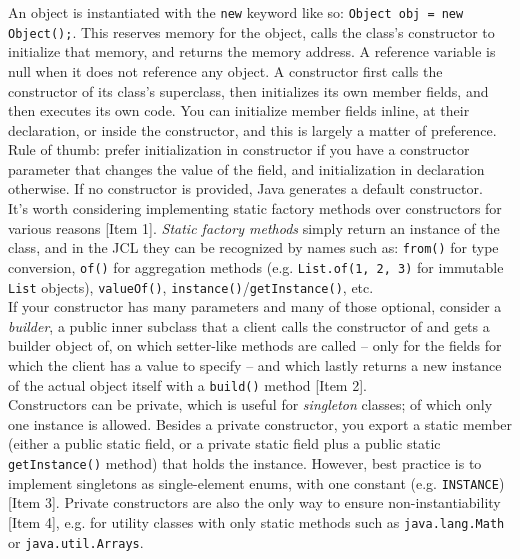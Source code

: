 \documentclass[8pt, table, xcdraw]{article}%
\begin{document}
An object is instantiated with the \lstinline{new} keyword like so: \lstinline{Object obj = new Object();}. This reserves memory for the object, calls the class's constructor to initialize that memory, and returns the memory address. A reference variable is null when it does not reference any object. A constructor first calls the constructor of its class's superclass, then initializes its own member fields, and then executes its own code. You can initialize member fields inline, at their declaration, or inside the constructor, and this is largely a matter of preference. Rule of thumb: prefer initialization in constructor if you have a constructor parameter that changes the value of the field, and initialization in declaration otherwise. If no constructor is provided, Java generates a default constructor.\\
It's worth considering implementing static factory methods over constructors for various reasons [Item 1]. \emph{Static factory methods} simply return an instance of the class, and in the JCL they can be recognized by names such as: \lstinline{from()} for type conversion, \lstinline{of()} for aggregation methods (e.g. \lstinline{List.of(1, 2, 3)} for immutable \lstinline{List} objects), \lstinline{valueOf()}, \lstinline{instance()}/\lstinline{getInstance()}, etc.\\
If your constructor has many parameters and many of those optional, consider a \emph{builder}, a public inner subclass that a client calls the constructor of and gets a builder object of, on which setter-like methods are called -- only for the fields for which the client has a value to specify -- and which lastly returns a new instance of the actual object itself with a \lstinline{build()} method [Item 2].\\
Constructors can be private, which is useful for \emph{singleton} classes; of which only one instance is allowed. Besides a private constructor, you export a static member (either a public static field, or a private static field plus a public static \lstinline{getInstance()} method) that holds the instance. However, best practice is to implement singletons as single-element enums, with one constant (e.g. \lstinline{INSTANCE}) [Item 3]. Private constructors are also the only way to ensure non-instantiability [Item 4], e.g. for utility classes with only static methods such as \lstinline{java.lang.Math} or \lstinline{java.util.Arrays}.
\end{document}
